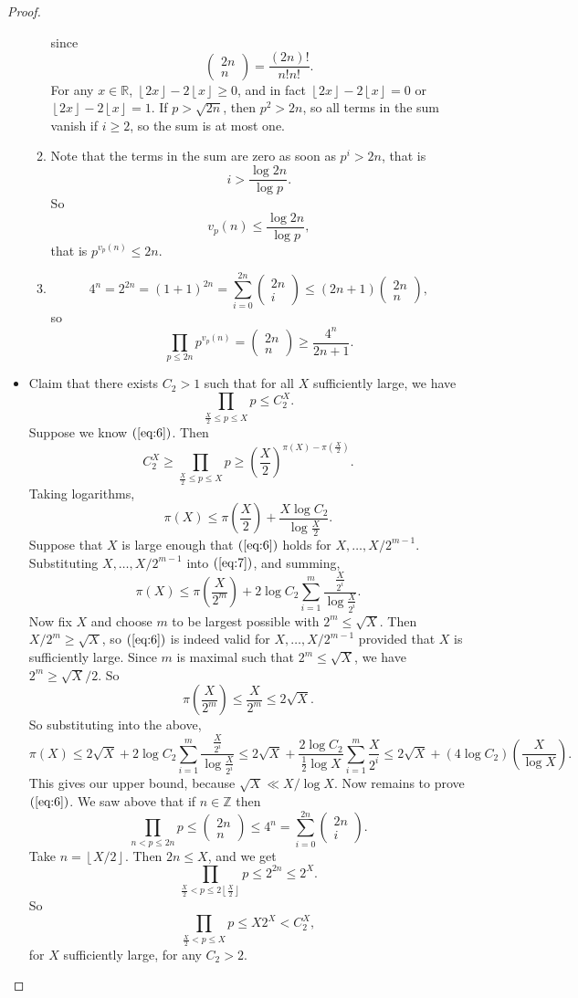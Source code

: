 \documentclass{article}
\newcommand{\Z}{\mathbb{Z}}
\newcommand{\R}{\mathbb{R}}
\newcommand{\rb}[1]{\left( #1 \right)}
\newcommand{\fb}[1]{\left\lfloor #1 \right\rfloor}
\newcommand{\two}[2]{\begin{pmatrix} #1 \\ #2 \end{pmatrix}}
\theoremstyle{definition}\newtheorem{definition}{Definition}
\theoremstyle{definition}\newtheorem{remark}[definition]{Remark}
\theoremstyle{definition}\newtheorem*{example}{Example}
\theoremstyle{definition}\newtheorem*{note}{Note}
\begin{document}
\begin{proof}
\begin{itemize}
\begin{enumerate}
since
$$ \two{2n}{n} = \dfrac{\rb{2n}!}{n!n!}. $$
For any $ x \in \R $, $ \fb{2x} - 2\fb{x} \ge 0 $, and in fact $ \fb{2x} - 2\fb{x} = 0 $ or $ \fb{2x} - 2\fb{x} = 1 $. If $ p > \sqrt{2n} $, then $ p^2 > 2n $, so all terms in the sum vanish if $ i \ge 2 $, so the sum is at most one.
\item Note that the terms in the sum are zero as soon as $ p^i > 2n $, that is
$$ i > \dfrac{\log 2n}{\log p}. $$
So
$$ v_p\rb{n} \le \dfrac{\log 2n}{\log p}, $$
that is $ p^{v_p\rb{n}} \le 2n $.
\item
$$ 4^n = 2^{2n} = \rb{1 + 1}^{2n} = \sum_{i = 0}^{2n} \two{2n}{i} \le \rb{2n + 1}\two{2n}{n}, $$
so
$$ \prod_{p \le 2n} p^{v_p\rb{n}} = \two{2n}{n} \ge \dfrac{4^n}{2n + 1}. $$
\end{enumerate}
\item Claim that there exists $ C_2 > 1 $ such that for all $ X $ sufficiently large, we have
\begin{equation}
\label{eq:6}
\prod_{\tfrac{X}{2} \le p \le X} p \le C_2^X.
\end{equation}
Suppose we know $ \rb{\ref{eq:6}} $. Then
$$ C_2^X \ge \prod_{\tfrac{X}{2} \le p \le X} p \ge \rb{\dfrac{X}{2}}^{\pi\rb{X} - \pi\rb{\tfrac{X}{2}}}. $$
Taking logarithms,
\begin{equation}
\label{eq:7}
\pi\rb{X} \le \pi\rb{\dfrac{X}{2}} + \dfrac{X\log C_2}{\log \tfrac{X}{2}}.
\end{equation}
Suppose that $ X $ is large enough that $ \rb{\ref{eq:6}} $ holds for $ X, \dots, X / 2^{m - 1} $. Substituting $ X, \dots, X / 2^{m - 1} $ into $ \rb{\ref{eq:7}} $, and summing,
$$ \pi\rb{X} \le \pi\rb{\dfrac{X}{2^m}} + 2\log C_2\sum_{i = 1}^m \dfrac{\tfrac{X}{2^i}}{\log \tfrac{X}{2^i}}. $$
Now fix $ X $ and choose $ m $ to be largest possible with $ 2^m \le \sqrt{X} $. Then $ X / 2^m \ge \sqrt{X} $, so $ \rb{\ref{eq:6}} $ is indeed valid for $ X, \dots, X / 2^{m - 1} $ provided that $ X $ is sufficiently large. Since $ m $ is maximal such that $ 2^m \le \sqrt{X} $, we have $ 2^m \ge \sqrt{X} / 2 $. So
$$ \pi\rb{\dfrac{X}{2^m}} \le \dfrac{X}{2^m} \le 2\sqrt{X}. $$
So substituting into the above,
$$ \pi\rb{X} \le 2\sqrt{X} + 2\log C_2\sum_{i = 1}^m \dfrac{\tfrac{X}{2^i}}{\log \tfrac{X}{2^i}} \le 2\sqrt{X} + \dfrac{2\log C_2}{\tfrac{1}{2}\log X}\sum_{i = 1}^m \dfrac{X}{2^i} \le 2\sqrt{X} + \rb{4\log C_2}\rb{\dfrac{X}{\log X}}. $$
This gives our upper bound, because $ \sqrt{X} \ll X / \log X $. Now remains to prove $ \rb{\ref{eq:6}} $. We saw above that if $ n \in \Z $ then
$$ \prod_{n < p \le 2n} p \le \two{2n}{n} \le 4^n = \sum_{i = 0}^{2n} \two{2n}{i}. $$
Take $ n = \fb{X / 2} $. Then $ 2n \le X $, and we get
$$ \prod_{\tfrac{X}{2} < p \le 2\fb{\tfrac{X}{2}}} p \le 2^{2n} \le 2^X. $$
So
$$ \prod_{\tfrac{X}{2} < p \le X} p \le X2^X < C_2^X, $$
for $ X $ sufficiently large, for any $ C_2 > 2 $.
\end{itemize}
\end{proof}
\end{document}
